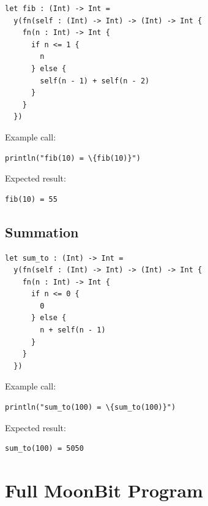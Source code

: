 \documentclass[manuscript]{acmart}
\begin{document}
\begin{lstlisting}
let fib : (Int) -> Int =
  y(fn(self : (Int) -> Int) -> (Int) -> Int {
    fn(n : Int) -> Int {
      if n <= 1 {
        n
      } else {
        self(n - 1) + self(n - 2)
      }
    }
  })
\end{lstlisting}

Example call:

\begin{lstlisting}
println("fib(10) = \{fib(10)}")
\end{lstlisting}

Expected result:

\begin{lstlisting}
fib(10) = 55
\end{lstlisting}

\subsection{Summation}

\begin{lstlisting}
let sum_to : (Int) -> Int =
  y(fn(self : (Int) -> Int) -> (Int) -> Int {
    fn(n : Int) -> Int {
      if n <= 0 {
        0
      } else {
        n + self(n - 1)
      }
    }
  })
\end{lstlisting}

Example call:

\begin{lstlisting}
println("sum_to(100) = \{sum_to(100)}")
\end{lstlisting}

Expected result:

\begin{lstlisting}
sum_to(100) = 5050
\end{lstlisting}

\section{Full MoonBit Program}
\end{document}
